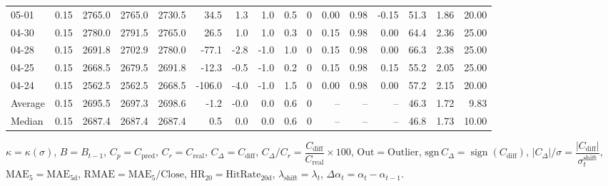 \begin{threeparttable}
{\begin{tabular}{lrrrrrrrrrrrrrrr}
  05-01 &     0.15 & 2765.0 & 2765.0 & 2730.5 &       34.5 &            1.3 &                      1.0 &                 0.5 &              0 &       0.00 &      0.98 &          -0.15 &             51.3 &            1.86 &                  20.00 \\
  04-30 &     0.15 & 2780.0 & 2791.5 & 2765.0 &       26.5 &            1.0 &                      1.0 &                 0.3 &              0 &       0.15 &      0.98 &           0.00 &             64.4 &            2.36 &                  25.00 \\
  04-28 &     0.15 & 2691.8 & 2702.9 & 2780.0 &      -77.1 &           -2.8 &                     -1.0 &                 1.0 &              0 &       0.15 &      0.98 &           0.00 &             66.3 &            2.38 &                  25.00 \\
  04-25 &     0.15 & 2668.5 & 2679.5 & 2691.8 &      -12.3 &           -0.5 &                     -1.0 &                 0.2 &              0 &       0.15 &      0.98 &           0.15 &             55.2 &            2.05 &                  25.00 \\
  04-24 &     0.15 & 2562.5 & 2562.5 & 2668.5 &     -106.0 &           -4.0 &                     -1.0 &                 1.5 &              0 &       0.00 &      0.98 &           0.00 &             57.2 &            2.15 &                  20.00 \\
Average &     0.15 & 2695.5 & 2697.3 & 2698.6 &       -1.2 &           -0.0 &                      0.0 &                 0.6 &              0 &         -- &        -- &             -- &             46.3 &            1.72 &                   9.83 \\
 Median &     0.15 & 2687.4 & 2687.4 & 2687.4 &        0.5 &            0.0 &                      0.0 &                 0.6 &              0 &         -- &        -- &             -- &             46.8 &            1.73 &                  10.00 \\
\bottomrule
\end{tabular}
}
\begin{tablenotes}\footnotesize
\item $\kappa=\kappa(\sigma)$, $B=B_{t-1}$, $C_p=C_{\text{pred}}$, $C_r=C_{\text{real}}$, $C_\Delta=C_{\text{diff}}$, $C_\Delta/C_r=\dfrac{C_{\text{diff}}}{C_{\text{real}}}\times100$, $\mathrm{Out}=\text{Outlier}$, $\mathrm{sgn}\,C_\Delta=\operatorname{sign}(C_{\text{diff}})$, $|C_\Delta|/\sigma=\dfrac{|C_{\text{diff}}|}{\sigma_t^{\text{shift}}}$, $\mathrm{MAE}_5=\mathrm{MAE}_{5\text{d}}$, $\mathrm{RMAE}= \mathrm{MAE}_5 / \text{Close}$, $\mathrm{HR}_{20}=\mathrm{HitRate}_{20\text{d}}$, 
$\lambda_{\text{shift}}=\lambda_t$, 
$\Delta\alpha_t=\alpha_t-\alpha_{t-1}$.
\end{tablenotes}
\end{threeparttable}
\endgroup

